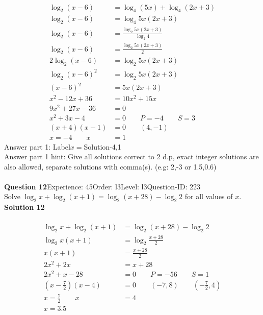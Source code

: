 \documentclass{article}
\begin{document}
\\[-35pt]\begin{align*}
\log_{2}(x-6)&=\log_{4}(5x)+\log_{4}(2x+3)\\[2pt]
\log_{2}(x-6)&=\log_{4}5x(2x+3)\\[2pt]
\log_{2}(x-6)&=\displaystyle\frac{\log_{2}5x(2x+3)}{\log_{2}4}\\[2pt]
\log_{2}(x-6)&=\displaystyle\frac{\log_{2}5x(2x+3)}{2}\\[2pt]
2\log_{2}(x-6)&=\log_{2}5x(2x+3)\\[2pt]
\log_{2}(x-6)^2&=\log_{2}5x(2x+3)\\[2pt]
(x-6)^2&=5x(2x+3)\\[2pt]
x^2-12x+36&=10x^2+15x\\[2pt]
9x^2+27x-36&=0\\[2pt]
x^2+3x-4&=0\qquad P=-4 \qquad S=3\\[2pt]
(x+4)(x-1)&=0 \qquad (4,-1)\\[2pt]
x=-4 \qquad x&=1
\end{align*}
Answer part 1: \hspace{10pt}Label\hspace{10pt}$x=$\hspace{10pt}Solution\hspace{10pt}-4,1\\
Answer part 1 hint: \hspace{15pt} Give all solutions correct to 2 d.p, exact integer solutions are also allowed, separate solutions with comma(s). (e.g: 2,-3 or 1.5,0.6)\\
\\[4pt]
\noindent\textbf{Question 12}\hspace{20pt}Experience: 45\hspace{20pt}Order: l3\hspace{20pt}Level: l3\hspace{20pt}Question-ID: 223\\[2pt]
Solve $\log_{2}x+\log_{2}(x+1)=\log_{2}(x+28)-\log_{2}2$ for all values of $x$.\\[4pt]
\noindent\textbf{Solution 12}\\[2pt]
\\[-35pt]\begin{align*}
\log_{2}x+\log_{2}(x+1)&=\log_{2}(x+28)-\log_{2}2\\[2pt]
\log_{2}x(x+1)&=\log_{2}\displaystyle\frac{x+28}{2}\\[2pt]
x(x+1)&=\displaystyle\frac{x+28}{2}\\[2pt]
2x^2+2x&=x+28\\[2pt]
2x^2+x-28&=0\qquad P=-56 \qquad S=1\\[2pt]
\left(x-\displaystyle\frac{7}{2}\right)(x-4)&=0\qquad (-7,8) \qquad \left(-\displaystyle\frac{7}{2},4\right)\\[2pt]
x=\displaystyle\frac{7}{2}\qquad x&=4\\[2pt]
x=3.5\hspace{22pt}&
\end{align*}
\end{document}
